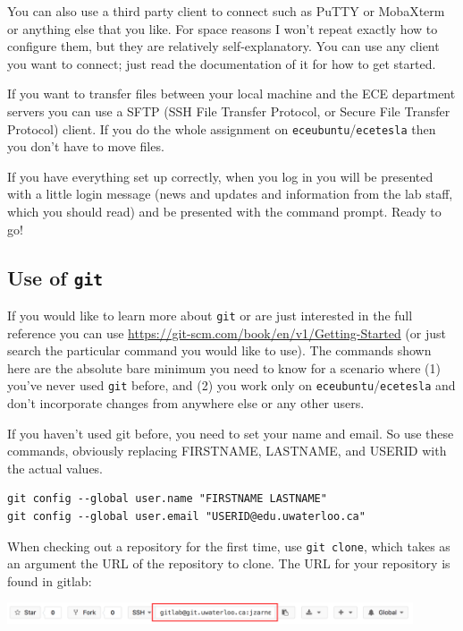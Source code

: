 \documentclass[letterpaper,10pt]{article}
\begin{document}
You can also use a third party client to connect such as PuTTY or MobaXterm or anything else that you like. For space reasons I won't repeat exactly how to configure them, but they are relatively self-explanatory. You can use any client you want to connect; just read the documentation of it for how to get started.

If you want to transfer files between your local machine and the ECE department servers you can use a SFTP (SSH File Transfer Protocol, or Secure File Transfer Protocol) client. If you do the whole assignment on \texttt{eceubuntu}/\texttt{ecetesla} then you don't have to move files.

If you have everything set up correctly, when you log in you will be presented with a little login message (news and updates and information from the lab staff, which you should read) and be presented with the command prompt. Ready to go!

\subsection*{Use of \texttt{git}}
If you would like to learn more about \texttt{git} or are just interested in the full reference you can use \url{https://git-scm.com/book/en/v1/Getting-Started} (or just search the particular command you would like to use). The commands shown here are the absolute bare minimum you need to know for a scenario where (1) you've never used \texttt{git} before, and (2) you work only on \texttt{eceubuntu}/\texttt{ecetesla} and don't incorporate changes from anywhere else or any other users.

If you haven't used git before, you need to set your name and email. So use these commands, obviously replacing FIRSTNAME, LASTNAME, and USERID with the actual values. 
\begin{lstlisting}
git config --global user.name "FIRSTNAME LASTNAME"
git config --global user.email "USERID@edu.uwaterloo.ca"
\end{lstlisting}

When checking out a repository for the first time, use \texttt{git clone}, which takes as an argument the URL of the repository to clone. The URL for your repository is found in gitlab:

\begin{center}
	\includegraphics[width=0.9\textwidth]{images/gitlab-clone.png}
\end{center}
\end{document}
